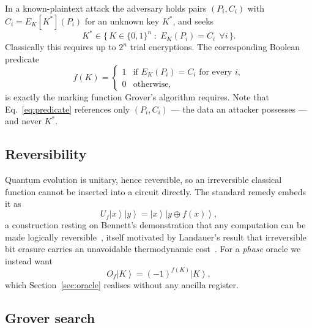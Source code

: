 \documentclass[11pt,a4paper]{article}
\newcommand{\ket}[1]{\left|#1\right\rangle}
\newcommand{\Ek}{E_K}
\begin{document}
In a known-plaintext attack the adversary holds pairs $(P_i, C_i)$ with
$C_i = \Ek[K^\ast](P_i)$ for an unknown key $K^\ast$, and seeks
\begin{equation}
  K^\ast \in \Big\{\, K \in \{0,1\}^n \;:\; \Ek(P_i) = C_i \ \ \forall i \,\Big\}.
\end{equation}
Classically this requires up to $2^n$ trial encryptions. The corresponding
Boolean predicate
\begin{equation}
  f(K) = \begin{cases}
    1 & \text{if } \Ek(P_i) = C_i \text{ for every } i,\\
    0 & \text{otherwise,}
  \end{cases}
  \label{eq:predicate}
\end{equation}
is exactly the marking function Grover's algorithm requires. Note that
Eq.~\eqref{eq:predicate} references only $(P_i, C_i)$ --- the data an attacker
possesses --- and never $K^\ast$.

\subsection{Reversibility}

Quantum evolution is unitary, hence reversible, so an irreversible classical
function cannot be inserted into a circuit directly. The standard remedy embeds
it as
\begin{equation}
  U_f \ket{x}\ket{y} = \ket{x}\ket{y \oplus f(x)},
\end{equation}
a construction resting on Bennett's demonstration that any computation can be
made logically reversible~\citep{bennett1973}, itself motivated by Landauer's
result that irreversible bit erasure carries an unavoidable thermodynamic
cost~\citep{landauer1961}. For a \emph{phase} oracle we instead want
\begin{equation}
  O_f \ket{K} = (-1)^{f(K)} \ket{K},
  \label{eq:phase-oracle}
\end{equation}
which Section~\ref{sec:oracle} realises without any ancilla register.

\subsection{Grover search}
\end{document}
